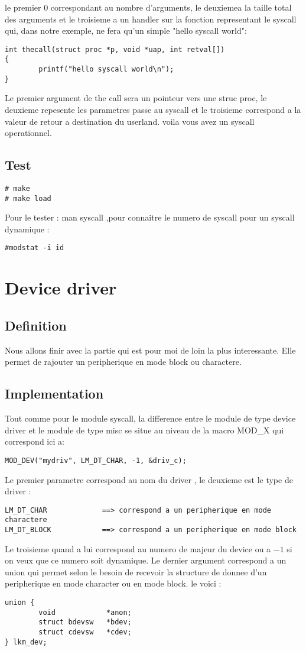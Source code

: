 \documentclass[a4paper, 11pt]{article}
\begin{document}
le premier $0$ correspondant au nombre d'arguments, le deuxiemea la taille total
des arguments et le troisieme a un handler sur la fonction representant le
syscall qui, dans notre exemple, ne fera qu'un simple "hello syscall world":
\begin{lstlisting}
int	thecall(struct proc *p, void *uap, int retval[])
{
        printf("hello syscall world\n");
}
\end{lstlisting}

Le premier argument de the call sera un pointeur vers une struc proc, le
deuxieme repesente les parametres passe au syscall et le troisieme correspond
a la valeur de retour a destination du userland.
voila vous avez un syscall operationnel.
\subsection{Test}
\begin{lstlisting}
# make
# make load
\end{lstlisting}
\par Pour le tester : man syscall ,pour connaitre le numero de syscall pour un syscall dynamique :
\begin{lstlisting}
#modstat -i id
\end{lstlisting}
\newpage
\section{Device driver}
\subsection{Definition}
Nous allons finir avec la partie qui est pour moi de loin la plus interessante.
Elle permet de rajouter un peripherique en mode block ou charactere.
\subsection{Implementation}
Tout comme pour le module syscall, la difference entre le module de type device
driver et le module de type misc se situe au niveau de la macro MOD\_X qui
correspond ici a:
\begin{lstlisting}
MOD_DEV("mydriv", LM_DT_CHAR, -1, &driv_c);
\end{lstlisting}
\par Le premier parametre correspond au nom du driver , le deuxieme est le type
de driver :
\begin{lstlisting}
LM_DT_CHAR             ==> correspond a un peripherique en mode charactere
LM_DT_BLOCK            ==> correspond a un peripherique en mode block
\end{lstlisting}
\par Le troisieme quand a lui correspond au numero de majeur du device ou a $-1$ si on
veux que ce numero soit dynamique. Le dernier argument correspond a un union
qui permet selon le besoin de recevoir la structure de donnee d'un peripherique
en mode character ou en mode block. le voici :
\begin{lstlisting}
union {
        void            *anon;
        struct bdevsw   *bdev;
        struct cdevsw   *cdev;
} lkm_dev;
\end{lstlisting}
\end{document}
